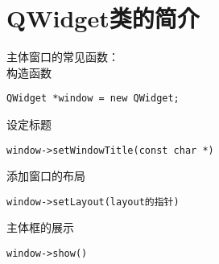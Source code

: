 \chapter{QWidget类的简介}
\noindent{}主体窗口的常见函数：\\
构造函数
{\color{red}\begin{verbatim}QWidget *window = new QWidget;\end{verbatim}}
\noindent{}设定标题
{\color{red}\begin{verbatim}window->setWindowTitle(const char *)\end{verbatim}}
\noindent{}添加窗口的布局
{\color{red}\begin{verbatim}window->setLayout(layout的指针)\end{verbatim}}
\noindent{}主体框的展示
{\color{red}\begin{verbatim}window->show()\end{verbatim}}
